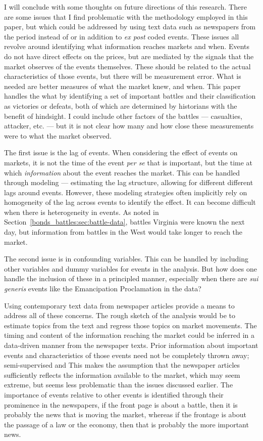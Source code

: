 I will conclude with some thoughts on future directions of this research.
There are some issues that I find problematic with the methodology employed in this paper, but which could be addressed by using text data such as newspapers from the period instead of or in addition to \textit{ex post} coded events.
These issues all revolve around identifying what information reaches markets and when. 
Events do not have direct effects on the prices, but are mediated by the signals that the market observes of the events themselves.
These should be related to the actual characteristics of those events, but there will be measurement error.
What is needed are better measures of what the market knew, and when.
This paper handles the what by identifying a set of important battles and their classification as victories or defeats, both of which are determined by historians with the benefit of hindsight.
I could include other factors of the battles --- casualties, attacker, etc. --- but it is not clear how many and how close these measurements were to what the market observed.

The first issue is the lag of events.
  When considering the effect of events on markets, it is not the time of the event \textit{per se} that is important, but the time at which \textit{information} about the event reaches the market.
  This can be handled through modeling --- \eg{}estimating the lag structure, allowing for different different lags around events.
  However, these modeling strategies often implicitly rely on homogeneity of the lag across events to identify the effect.
  It can become difficult when there is heterogeneity in events.
  As noted in Section~\ref{bonds_battles:sec:battle-data}, battles Virginia were known the next day, but information from battles in the West would take longer to reach the market.

The second issue is in confounding variables.
  This can be handled by including other variables and dummy variables for events in the analysis.
  But how does one handle the inclusion of these in a principled manner, especially when there are \textit{sui generis} events like the Emancipation Proclamation in the data?

Using contemporary text data from newspaper articles provide a means to address all of these concerns.
The rough sketch of the analysis would be to estimate topics from the text and regress those topics on market movements.
The timing and content of the information reaching the market could be inferred in a data-driven manner from the newspaper texts.
Prior information about important events and characteristics of those events need not be completely thrown away; 
semi-supervised and 
This makes the assumption that the newspaper articles sufficiently reflects the information available to the market, which may seem extreme, but seems less problematic than the issues discussed earlier.
The importance of events relative to other events is identified through their prominence in the newspapers, \eg{}if the front page is about a battle, then it is probably the news that is moving the market, whereas if the frontage is about the passage of a law or the economy, then that is probably the more important news.


